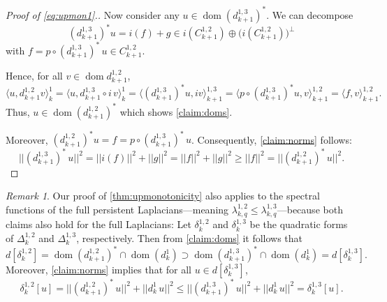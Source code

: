 \documentclass[11pt]{article}
\theoremstyle{definition}
\theoremstyle{remark}
\newtheorem{remark}[theorem]{Remark}
\DeclareMathOperator\dom{dom}
\begin{document}
\begin{proof}[Proof of \eqref{eq:upmon1}.]
    Now consider any
    $u\in\dom (d^{1,3}_{k+1})^*$. We can decompose
    $$(d^{1,3}_{k+1})^*u=i(f)+g \in i(C^{1,2}_{k+1}) \oplus \big(i(C_{k+1}^{1,2})\big)^\perp$$ with $f=p \circ (d_{k+1}^{1,3})^* \, u  \in C^{1,2}_{k+1}$.
    
    Hence, for all $v\in \dom d^{1,2}_{k+1}$,
    $$
        \langle u, d_{k+1}^{1,2} v \rangle_k^1 = \langle u, d_{k+1}^{1,3} \circ i \, v \rangle_k^1 = \langle (d_{k+1}^{1,3})^* u, iv \rangle _{k+1}^{1,3} = \langle p \circ (d_{k+1}^{1,3})^* u, v \rangle _{k+1}^{1,2} = \langle f, v \rangle _{k+1}^{1,2}.
    $$
    Thus, $u \in \dom(d_{k+1}^{1,2})^*$ which shows \cref{claim:doms}.
    
    Moreover, $(d_{k+1}^{1,2})^* u = f= p \circ (d_{k+1}^{1,3})^* \, u $. Consequently, \cref{claim:norms} follows:
    $$
    ||(d_{k+1}^{1,3})^* \, u||^2 = ||i(f)||^2 + ||g||^2 = ||f||^2 + ||g||^2 \ge ||f||^2= ||(d_{k+1}^{1,2})^* \, u||^2.
    $$
\end{proof}

\begin{remark} \label{rem:fullmon1213}
    Our proof of \cref{thm:upmonotonicity} also applies to the spectral functions of the full persistent Laplacians---meaning $\lambda_{k,q}^{1,2} \le \lambda_{k,q}^{1,3}$---because both claims also hold for the full Laplacians: Let $\delta_k^{1,2}$ and $\delta_k^{1,3}$ be the quadratic forms of $\Delta_k^{1,2}$ and $\Delta_k^{1,3}$, respectively. Then from \cref{claim:doms} it follows that $$ d[\delta_k^{1,2}]=\dom (d_{k+1}^{1,2})^*\cap \dom(d_k^1) \supset \dom (d_{k+1}^{1,3})^*\cap \dom(d_k^1) = d[\delta_k^{1,3}].$$
    Moreover, \cref{claim:norms} implies that for all $u \in d[\delta_k^{1,3}]$,
    $$
    \delta_k^{1,2}[u]=||(d_{k+1}^{1,2})^*\, u||^2 + ||d_k^1 \, u||^2 \le ||(d_{k+1}^{1,3})^*\, u||^2 + ||d_k^1 \, u||^2 = \delta_k^{1,3}[u].
    $$
\end{remark}
\end{document}
